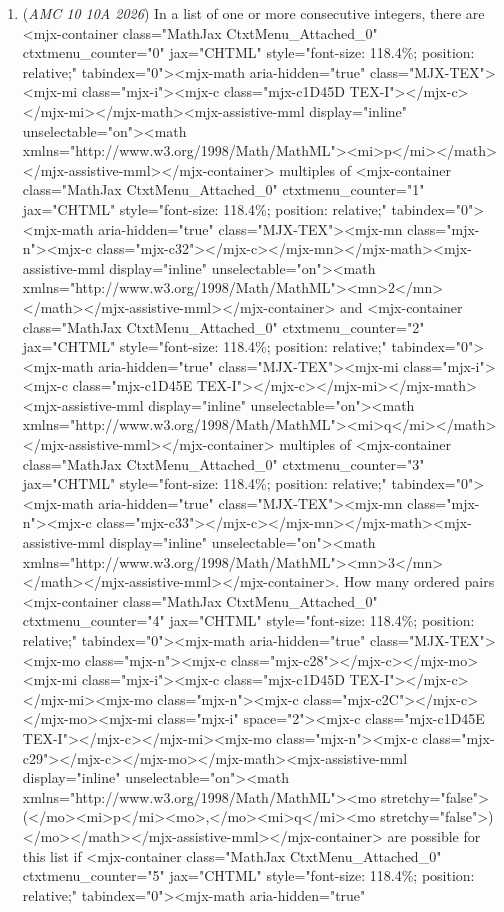 \begin{enumerate}
 $\overline{AE}= 2*2\sin(60) = 2\sqrt{3}$. 

 Therefore, 

 $\frac{9}{a} = 2\sqrt{3} \implies a= \frac{3\sqrt{3}}{2}$ 

 Hence the major axis is $2a = 3\sqrt{3}$. The answer is $3 + 3 = \boxed{\text{(A) }6}.$



	\item (\textit{AMC 10 10A 2026}) In a list of one or more consecutive integers, there are <mjx-container class="MathJax CtxtMenu\_Attached\_0" ctxtmenu\_counter="0" jax="CHTML" style="font-size: 118.4\%; position: relative;" tabindex="0"><mjx-math aria-hidden="true" class="MJX-TEX"><mjx-mi class="mjx-i"><mjx-c class="mjx-c1D45D TEX-I"></mjx-c></mjx-mi></mjx-math><mjx-assistive-mml display="inline" unselectable="on"><math xmlns="http://www.w3.org/1998/Math/MathML"><mi>p</mi></math></mjx-assistive-mml></mjx-container> multiples of <mjx-container class="MathJax CtxtMenu\_Attached\_0" ctxtmenu\_counter="1" jax="CHTML" style="font-size: 118.4\%; position: relative;" tabindex="0"><mjx-math aria-hidden="true" class="MJX-TEX"><mjx-mn class="mjx-n"><mjx-c class="mjx-c32"></mjx-c></mjx-mn></mjx-math><mjx-assistive-mml display="inline" unselectable="on"><math xmlns="http://www.w3.org/1998/Math/MathML"><mn>2</mn></math></mjx-assistive-mml></mjx-container> and <mjx-container class="MathJax CtxtMenu\_Attached\_0" ctxtmenu\_counter="2" jax="CHTML" style="font-size: 118.4\%; position: relative;" tabindex="0"><mjx-math aria-hidden="true" class="MJX-TEX"><mjx-mi class="mjx-i"><mjx-c class="mjx-c1D45E TEX-I"></mjx-c></mjx-mi></mjx-math><mjx-assistive-mml display="inline" unselectable="on"><math xmlns="http://www.w3.org/1998/Math/MathML"><mi>q</mi></math></mjx-assistive-mml></mjx-container> multiples of <mjx-container class="MathJax CtxtMenu\_Attached\_0" ctxtmenu\_counter="3" jax="CHTML" style="font-size: 118.4\%; position: relative;" tabindex="0"><mjx-math aria-hidden="true" class="MJX-TEX"><mjx-mn class="mjx-n"><mjx-c class="mjx-c33"></mjx-c></mjx-mn></mjx-math><mjx-assistive-mml display="inline" unselectable="on"><math xmlns="http://www.w3.org/1998/Math/MathML"><mn>3</mn></math></mjx-assistive-mml></mjx-container>. How many ordered pairs <mjx-container class="MathJax CtxtMenu\_Attached\_0" ctxtmenu\_counter="4" jax="CHTML" style="font-size: 118.4\%; position: relative;" tabindex="0"><mjx-math aria-hidden="true" class="MJX-TEX"><mjx-mo class="mjx-n"><mjx-c class="mjx-c28"></mjx-c></mjx-mo><mjx-mi class="mjx-i"><mjx-c class="mjx-c1D45D TEX-I"></mjx-c></mjx-mi><mjx-mo class="mjx-n"><mjx-c class="mjx-c2C"></mjx-c></mjx-mo><mjx-mi class="mjx-i" space="2"><mjx-c class="mjx-c1D45E TEX-I"></mjx-c></mjx-mi><mjx-mo class="mjx-n"><mjx-c class="mjx-c29"></mjx-c></mjx-mo></mjx-math><mjx-assistive-mml display="inline" unselectable="on"><math xmlns="http://www.w3.org/1998/Math/MathML"><mo stretchy="false">(</mo><mi>p</mi><mo>,</mo><mi>q</mi><mo stretchy="false">)</mo></math></mjx-assistive-mml></mjx-container> are possible for this list if <mjx-container class="MathJax CtxtMenu\_Attached\_0" ctxtmenu\_counter="5" jax="CHTML" style="font-size: 118.4\%; position: relative;" tabindex="0"><mjx-math aria-hidden="true" 
\end{enumerate}
